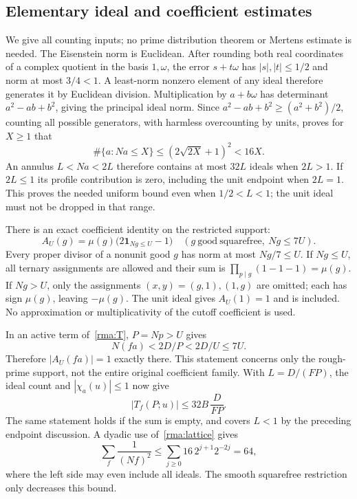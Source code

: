 \subsection{Elementary ideal and coefficient estimates}
We give all counting inputs; no prime distribution theorem or Mertens
estimate is needed. The Eisenstein norm is Euclidean. After rounding
both real coordinates of a complex quotient in the basis $1,\omega$,
the error $s+t\omega$ has $|s|,|t|\le1/2$ and norm at most $3/4<1$.
A least-norm nonzero element of any ideal therefore generates it by
Euclidean division. Multiplication by $a+b\omega$ has determinant
$a^2-ab+b^2$, giving the principal ideal norm. Since
$a^2-ab+b^2\ge(a^2+b^2)/2$, counting all possible generators, with
harmless overcounting by units, proves for $X\ge1$ that
\begin{equation}\label{rma:lattice}
 \#\{a:Na\le X\}\le(2\sqrt{2X}+1)^2<16X.
\end{equation}
An annulus $L<Na<2L$ therefore contains at most $32L$ ideals when
$2L>1$. If $2L\le1$ its profile contribution is zero, including the
unit endpoint when $2L=1$. This proves the needed uniform bound even
when $1/2<L<1$; the unit ideal must not be dropped in that range.

There is an exact coefficient identity on the restricted support:
\begin{equation}\label{rma:coefficient}
 A_U(g)=\mu(g)\bigl(2\mathbf1_{Ng\le U}-1\bigr)
 \quad(g\ \mathrm{good\ squarefree},\ Ng\le7U).
\end{equation}
Every proper divisor of a nonunit good $g$ has norm at most $Ng/7\le U$.
If $Ng\le U$, all ternary assignments are allowed and their sum is
$\prod_{p\mid g}(1-1-1)=\mu(g)$. If $Ng>U$, only the assignments
$(x,y)=(g,1),(1,g)$ are omitted; each has sign $\mu(g)$, leaving
$-\mu(g)$. The unit ideal gives $A_U(1)=1$ and is included.
No approximation or multiplicativity of the cutoff coefficient is used.

In an active term of~\eqref{rma:T}, $P=Np>U$ gives
\[
 N(fa)<2D/P<2D/U\le7U.
\]
Therefore $|A_U(fa)|=1$ exactly there. This statement concerns only the
rough-prime support, not the entire original coefficient family.
With $L=D/(FP)$, the ideal count and $|\chi_a(u)|\le1$ now give
\begin{equation}\label{rma:Tbound}
 |T_f(P;u)|\le32B\,\frac{D}{FP}.
\end{equation}
The same statement holds if the sum is empty, and covers $L<1$ by the
preceding endpoint discussion. A dyadic use of~\eqref{rma:lattice} gives
\begin{equation}\label{rma:fsum}
 \sum_f\frac1{(Nf)^2}
 \le\sum_{j\ge0}16\,2^{j+1}2^{-2j}=64,
\end{equation}
where the left side may even include all ideals. The smooth squarefree
restriction only decreases this bound.

